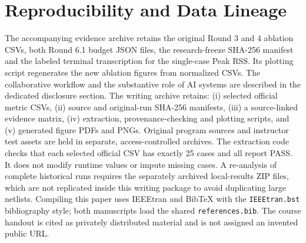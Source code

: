 \documentclass[journal,10pt]{IEEEtran}
\begin{document}
\section{Reproducibility and Data Lineage}
The accompanying evidence archive retains the original Round 3 and 4 ablation CSVs, both Round 6.1 budget JSON files, the research-freeze SHA-256 manifest and the labeled terminal transcription for the single-case Peak RSS. Its plotting script regenerates the new ablation figures from normalized CSVs. The collaborative workflow and the substantive role of AI systems are described in the dedicated disclosure section. The writing archive retains: (i) selected official metric CSVs, (ii) source and original-run SHA-256 manifests, (iii) a source-linked evidence matrix, (iv) extraction, provenance-checking and plotting scripts, and (v) generated figure PDFs and PNGs. Original program sources and instructor test assets are held in separate, access-controlled archives. The extraction code checks that each selected official CSV has exactly 25 cases and all report PASS. It does not modify runtime values or impute missing cases. A re-analysis of complete historical runs requires the separately archived local-results ZIP files, which are not replicated inside this writing package to avoid duplicating large netlists. Compiling this paper uses IEEEtran and BibTeX with the \texttt{IEEEtran.bst} bibliography style; both manuscripts load the shared \texttt{references.bib}. The course handout is cited as privately distributed material and is not assigned an invented public URL.



\end{document}
